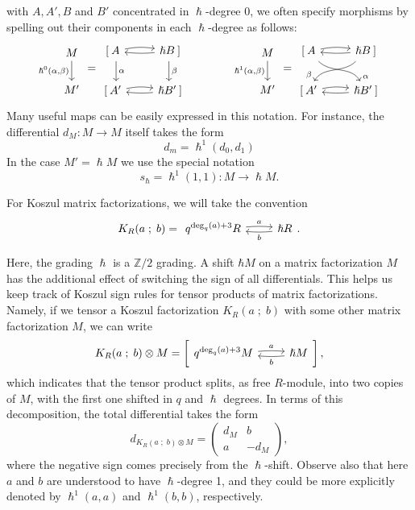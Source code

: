 \documentclass{article}
\newcommand{\Z}{\mathbb{Z}}
\renewcommand{\sc}{\; ; \;}
\newcommand{\mfshort}[4]{%
  \begin{tikzcd}[ampersand replacement=\&]
    {#1} \arrow[r, "#3", bend left=5,start anchor=east, end anchor=west, shift left=2pt]  \& 
    {#2} \arrow[l,"#4", bend left=5, start anchor=west, end anchor=east, shift left=2pt]
  \end{tikzcd}%
}
\theoremstyle{plain} %
\theoremstyle{definition} %
\theoremstyle{remark} %
\begin{document}
with $A,A',B$ and $B'$ concentrated in $\hslash$-degree 0, we often specify morphisms by spelling out their components in each $\hslash$-degree as follows:
\[
\begin{tikzcd}
    M 
    \arrow[d, "{\hslash^0(\alpha,\beta)}",swap] 
    \\ 
    M'
\end{tikzcd}
=
\begin{tikzcd}
    {} [ \: A \arrow[d, "\alpha", shift left=3pt]
    \arrow[r, out=5, in=175, bend left=10]  
    &  
    \hslash B\:]
    \arrow[d, "\beta", shift right=1pt] 
    \arrow[l, out=185, in=-5, swap]
    \\
   	{}  [\:A' 
   	\arrow[r, out=5, in=175, bend left=10]
   	& 
    \hslash B' \:]
    \arrow[l, out=185, in=-5, swap]
\end{tikzcd}
\qquad\qquad 
\begin{tikzcd}
    M 
    \arrow[d, "{\hslash^1(\alpha,\beta)}",swap] 
    \\ 
    M'
\end{tikzcd}
=
\begin{tikzcd}
    {}  [\:A \arrow[dr, "\alpha"{pos=1}, out=-45, in=120]\arrow[r, out=5, in=175, bend left=10]  &  \hslash B\:]\arrow[dl, "\beta"{pos=1}, out=-135, in=60,swap] \arrow[l, out=185, in=-5, swap]\\
     {} [\:A' \arrow[r, out=5, in=175, bend left=10]& 
     \hslash B' \arrow[l, out=185, in=-5, swap]\:]
\end{tikzcd}
\]
Many useful maps can be easily expressed in this notation. For instance, the differential $d_M:M\to M$ itself takes the form
$$
d_m=\hslash^1 (d_0,d_1)
$$
In the case $M'=\hslash M$ we use the special notation
$$
s_\hslash =\hslash^1(1,1):M\to \hslash M
.
$$

For Koszul matrix factorizations, we will take the convention
$$
K_{R}(a\sc b)=\mfshort{q^{\deg_q(a)+3}R}{ \hslash R}{a}{b}
.
$$

Here, the grading $\hslash$ is a $\Z/2$ grading. A shift $\hbar M$ on a matrix factorization $M$ has the additional effect of switching the sign of all differentials. This helps us keep track of Koszul sign rules for tensor products of matrix factorizations. Namely, if we tensor a Koszul factorization $K_{R}(a\sc b)$ with some other matrix factorization $M$, we can write
$$
K_{R}(a\sc b)\otimes M =\left[ \mfshort{q^{\deg_q(a)+3}M}{\hslash M}{a}{b} \right]
,
$$
which indicates that the tensor product splits, as free $R$-module, into two copies of $M$, with the first one shifted in $q$ and $\hslash$ degrees. In terms of this decomposition, the total differential takes the form
$$
d_{K_{R}(a\sc b)\otimes M} 
= 
\begin{pmatrix}
   	d_M & b 
   	\\ 
   	a & -d_M
\end{pmatrix}
,
$$
where the negative sign comes precisely from the $\hslash$-shift. Observe also that here $a$ and $b$ are understood to have $\hslash$-degree 1, and they could be more explicitly denoted by $\hslash^1(a,a)$ and $\hslash^1(b,b)$, respectively.
\end{document}
